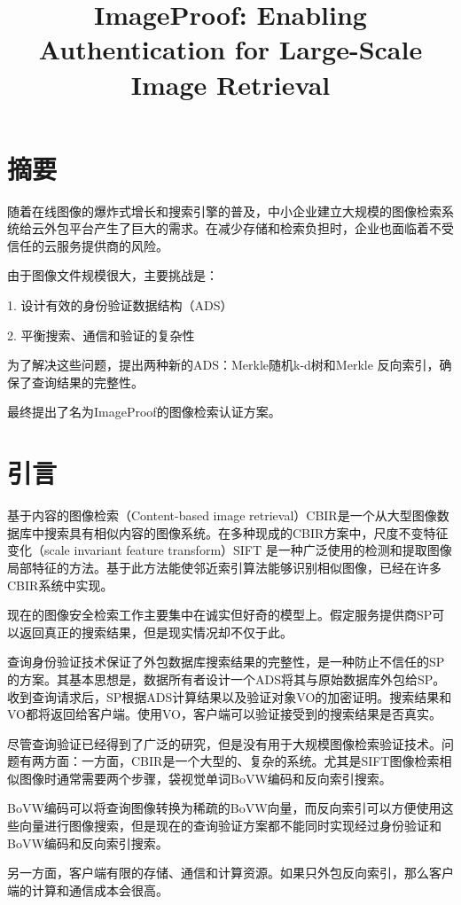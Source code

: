 \documentclass{article}
\title{ImageProof: Enabling Authentication for Large-Scale Image Retrieval}
\begin{document}
    
\maketitle

\section{摘要}

随着在线图像的爆炸式增长和搜索引擎的普及，中小企业建立大规模的图像检索系统给云外包平台产生了巨大的需求。在减少存储和检索负担时，企业也面临着不受信任的云服务提供商的风险。

由于图像文件规模很大，主要挑战是：

1. 设计有效的身份验证数据结构（ADS）

2. 平衡搜索、通信和验证的复杂性

为了解决这些问题，提出两种新的ADS：Merkle随机k-d树和Merkle 反向索引，确保了查询结果的完整性。

最终提出了名为ImageProof的图像检索认证方案。

\section{引言}

基于内容的图像检索（Content-based image retrieval）CBIR是一个从大型图像数据库中搜索具有相似内容的图像系统。在多种现成的CBIR方案中，尺度不变特征变化（scale invariant feature transform）SIFT 是一种广泛使用的检测和提取图像局部特征的方法。基于此方法能使邻近索引算法能够识别相似图像，已经在许多CBIR系统中实现。

现在的图像安全检索工作主要集中在诚实但好奇的模型上。假定服务提供商SP可以返回真正的搜索结果，但是现实情况却不仅于此。

查询身份验证技术保证了外包数据库搜索结果的完整性，是一种防止不信任的SP的方案。其基本思想是，数据所有者设计一个ADS将其与原始数据库外包给SP。收到查询请求后，SP根据ADS计算结果以及验证对象VO的加密证明。搜索结果和VO都将返回给客户端。使用VO，客户端可以验证接受到的搜索结果是否真实。

尽管查询验证已经得到了广泛的研究，但是没有用于大规模图像检索验证技术。问题有两方面：一方面，CBIR是一个大型的、复杂的系统。尤其是SIFT图像检索相似图像时通常需要两个步骤，袋视觉单词BoVW编码和反向索引搜索。

BoVW编码可以将查询图像转换为稀疏的BoVW向量，而反向索引可以方便使用这些向量进行图像搜索，但是现在的查询验证方案都不能同时实现经过身份验证和BoVW编码和反向索引搜索。

另一方面，客户端有限的存储、通信和计算资源。如果只外包反向索引，那么客户端的计算和通信成本会很高。
\end{document}
